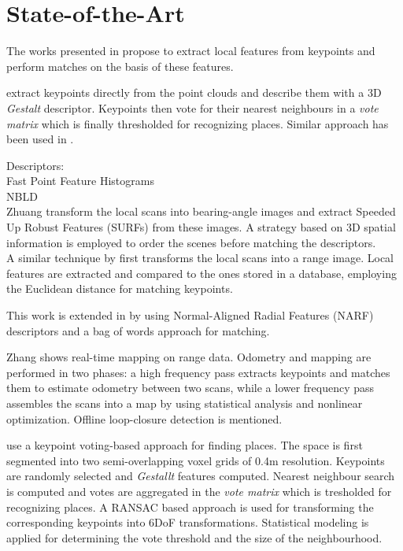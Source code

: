 \section{State-of-the-Art}
\label{sec:SOTA}

The works presented in \cite{bosse2013place, zhuang20133, steder2010robust, steder2011place, Gawel2016} propose to extract local features from keypoints and perform matches on the basis of these features.

\citet{bosse2013place} extract keypoints directly from the point clouds and describe them with a 3D \textit{Gestalt} descriptor. Keypoints then vote for their nearest neighbours in a \textit{vote matrix} which is finally thresholded for recognizing places. Similar approach has been used in \cite{Gawel2016}.


Descriptors:\\ 

Fast Point Feature Histograms ~\cite{rusu2009fast}  \\

NBLD ~\cite{cieslewski2016point}\\

Zhuang \citet{zhuang20133} transform the local scans into bearing-angle images and extract Speeded Up Robust Features (SURFs) from these images. A strategy based on 3D spatial information is employed to order the scenes before matching the descriptors. \\

A similar technique by \citet{steder2010robust} first transforms the local scans into a range image.  Local features are extracted and compared to the ones stored in a database, employing the Euclidean distance for matching keypoints.

This work is extended in \cite{steder2011place} by using Normal-Aligned Radial Features (NARF) descriptors and a bag of words approach for matching.


Zhang \citet{zhang2014loam} shows real-time mapping on range data. Odometry and mapping are performed in two phases: a high frequency pass extracts keypoints and matches them to estimate odometry between two scans, while a lower frequency pass assembles the scans into a map by using statistical analysis and nonlinear optimization. Offline loop-closure detection is mentioned.

\citet{bosse2013place} use a keypoint voting-based approach for finding places. The space is first segmented into two semi-overlapping voxel grids of 0.4m resolution. Keypoints are randomly selected and \textit{Gestallt} features computed. Nearest neighbour search is computed and votes are aggregated in the \textit{vote matrix} which is tresholded for recognizing places. A RANSAC based approach is used for transforming the corresponding keypoints into 6DoF transformations. Statistical modeling is applied for determining the vote threshold and the size of the neighbourhood.

